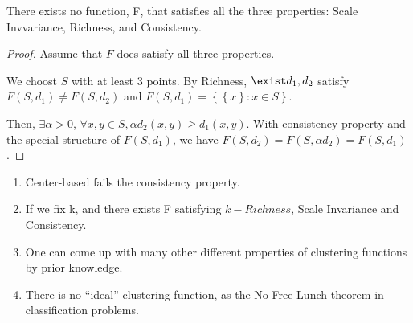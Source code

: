 \begin{theorem}
    There exists no function, F, that satisfies all the three properties: Scale Invvariance, Richness, and Consistency.
    \begin{proof}
        Assume that $ F $ does satisfy all three properties.

        We choost $ S $ with at least 3 points. By Richness, $ \exist d_1, d_2 $ satisfy $ F(S, d_1) \ne F(S, d_2) $ and $ F(S, d_1) = \left\{ \left\{ x \right\}: x \in S \right\} $.

        Then, $ \exists \alpha > 0 $, $ \forall x, y \in S, \alpha d_2(x, y) \ge d_1(x,y) $. With consistency property and the special structure of $ F(S, d_1) $, we have $ F(S, d_2) = F(S, \alpha d_2) = F(S, d_1) $.
    \end{proof}
\end{theorem}

\begin{enumerate}
    \item Center-based fails the consistency property.
    \item If we fix k, and there exists F satisfying $ k-Richness $, Scale Invariance and Consistency.
    \item One can come up with many other different properties of clustering functions by prior knowledge.
    \item There is no ``ideal'' clustering function, as the No-Free-Lunch theorem in classification problems.
\end{enumerate}

